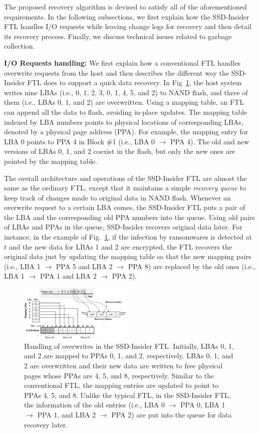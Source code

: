 \documentclass[conference]{IEEEtran}
\newcommand{\ours}{SSD-Insider}
\begin{document}
The proposed recovery algorithm is devised to satisfy all of the
aforementioned requirements.  In the following subsections, we
first explain how the \ours{} FTL handles I/O requests while
leaving change logs for recovery and then detail its recovery
process.  Finally, we discuss technical issues related to garbage
collection.

{\bf I/O Requests handling:} 
We first explain how a conventional FTL handles overwrite requests from the
host and then describes the different way the SSD-Insider FTL does to support a
quick data recovery.  In Fig~\ref{fig:io-handling}, the host system writes nine
LBAs (i.e., 0, 1, 2, 3, 0, 1, 4, 5, and 2) to NAND flash, and three of them
(i.e., LBAs 0, 1, and 2) are overwritten.  Using a mapping table, an FTL can
append all the data to flash, avoiding in-place updates. The mapping table
indexed by LBA numbers points to physical locations of corresponding LBAs,
denoted by a physical page address (PPA). For example, the mapping entry for
LBA 0 points to PPA 4 in Block \#1 (i.e., LBA 0 $\rightarrow$ PPA 4).  The old
and new versions of LBAs 0, 1, and 2 coexist in the flash, but only the new
ones are pointed by the mapping table. 

The overall architecture and operations of the \ours{} FTL are almost the same
as the ordinary FTL, except that it maintains a simple \textit{recovery queue}
to keep track of changes made to original data in NAND flash.  Whenever an
overwrite request to a certain LBA comes, the \ours{} FTL puts a pair of the
LBA and the corresponding old PPA numbers into the queue.  Using old pairs of
LBAs and PPAs in the queue, \ours{} recovers original data later.  For
instance, in the example of Fig.~\ref{fig:io-handling}, if the infection by
ransomwares is detected at $t$ and the new data for LBAs 1 and 2 are encrypted,
the FTL recovers the original data just by updating the mapping table so that
the new mapping pairs (i.e., LBA 1 $\rightarrow$ PPA 5 and LBA 2 $\rightarrow$
PPA 8) are replaced by the old ones (i.e., LBA 1 $\rightarrow$ PPA 1 and LBA 2
$\rightarrow$ PPA 2).


\begin{figure}
\centering
\includegraphics[width=0.48\textwidth]{fig/flash-fig2}
\caption{
Handling of overwrites in the \ours{} FTL.  Initially, LBAs 0, 1, and 2 are
mapped to PPAs 0, 1, and 2, respectively.  LBAs 0, 1, and 2 are overwritten and
their new data are written to free physical pages whose PPAs are 4, 5, and 8,
respectively. Similar to the conventional FTL, the mapping entries are updated
to point to PPAs 4, 5, and 8.  Unlike the typical FTL, in the \ours{} FTL, the information
of the old entries (i.e., LBA 0 $\rightarrow$ PPA 0, LBA 1 $\rightarrow$ PPA 1, and LBA 2
$\rightarrow$ PPA 2) are put into the queue for data recovery later.
}
\label{fig:io-handling}
\end{figure}
\end{document}

